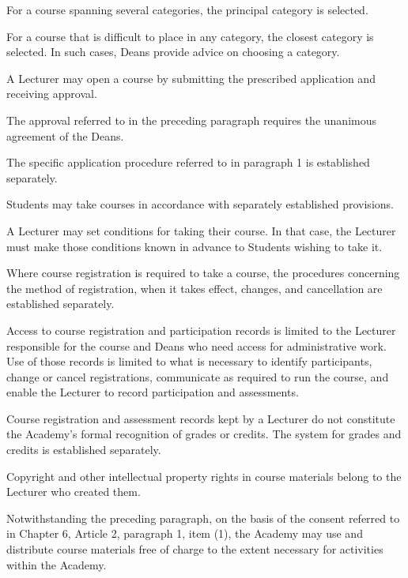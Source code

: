 \begin{articles}
\begin{paragraphs}
    \item For a course spanning several categories, the principal category is selected.
    \item For a course that is difficult to place in any category, the closest category is selected. In such cases, Deans provide advice on choosing a category.
  \end{paragraphs}
  \item A Lecturer may open a course by submitting the prescribed application and receiving approval.
  \begin{paragraphs}
    \item The approval referred to in the preceding paragraph requires the unanimous agreement of the Deans.
    \item The specific application procedure referred to in paragraph 1 is established separately.
  \end{paragraphs}
  \item Students may take courses in accordance with separately established provisions.
  \begin{paragraphs}
    \item A Lecturer may set conditions for taking their course. In that case, the Lecturer must make those conditions known in advance to Students wishing to take it.
    \item Where course registration is required to take a course, the procedures concerning the method of registration, when it takes effect, changes, and cancellation are established separately.
    \item Access to course registration and participation records is limited to the Lecturer responsible for the course and Deans who need access for administrative work. Use of those records is limited to what is necessary to identify participants, change or cancel registrations, communicate as required to run the course, and enable the Lecturer to record participation and assessments.
    \item Course registration and assessment records kept by a Lecturer do not constitute the Academy's formal recognition of grades or credits. The system for grades and credits is established separately.
  \end{paragraphs}
  \item Copyright and other intellectual property rights in course materials belong to the Lecturer who created them.
  \begin{paragraphs}
    \item Notwithstanding the preceding paragraph, on the basis of the consent referred to in Chapter 6, Article 2, paragraph 1, item (1), the Academy may use and distribute course materials free of charge to the extent necessary for activities within the Academy.

\end{paragraphs}
\end{articles}
